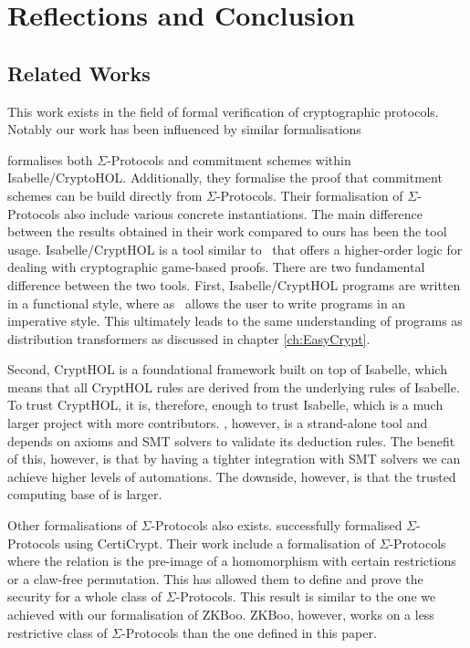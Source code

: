 \chapter{Reflections and Conclusion}
\label{sec:reflection_conclusion}

\section{Related Works}
\label{sec:related_works}
This work exists in the field of formal verification of cryptographic protocols.
Notably our work has been influenced by similar formalisations
\cite{cryptoeprint:2019:1185,DBLP:journals/corr/MetereD17,certicrypt_sigma,zkcrypt,Yao}

\cite{cryptoeprint:2019:1185} formalises both $\Sigma$-Protocols and
commitment schemes within Isabelle/CryptoHOL. Additionally, they formalise
the proof that commitment schemes can be build directly from $\Sigma$-Protocols.
Their formalisation of $\Sigma$-Protocols also include various concrete instantiations.
The main difference between the results obtained in their work compared to ours
has been the tool usage. Isabelle/CryptHOL is a tool similar to \easycrypt\ that
offers a higher-order logic for dealing with cryptographic game-based proofs.
There are two fundamental difference between the two tools.
First, Isabelle/CryptHOL programs are written in a functional style, where as
\easycrypt\ allows the user to write programs in an imperative style. This
ultimately leads to the same understanding of programs as distribution
transformers as discussed in chapter \ref{ch:EasyCrypt}.

Second, CryptHOL is a foundational framework built on top of Isabelle, which
means that all CryptHOL rules are derived from the underlying rules of Isabelle.
To trust CryptHOL, it is, therefore, enough to trust Isabelle, which is a much
larger project with more contributors. \easycrypt, however, is a strand-alone
tool and depends on axioms and SMT solvers to validate its deduction rules.
The benefit of this, however, is that by having a tighter integration with SMT
solvers we can achieve higher levels of automations. The downside, however, is
that the trusted computing base of \easycrypt is larger.

Other formalisations of $\Sigma$-Protocols also exists. \cite{certicrypt_sigma}
successfully formalised $\Sigma$-Protocols using CertiCrypt. Their work include a
formalisation of $\Sigma$-Protocols where the relation is the pre-image of a
homomorphism with certain restrictions or a claw-free permutation. This has
allowed them to define and prove the security for a whole class of
$\Sigma$-Protocols.
This result is similar to the one we achieved with our
formalisation of ZKBoo. ZKBoo, however, works on a less restrictive class of
$\Sigma$-Protocols than the one defined in this paper.

